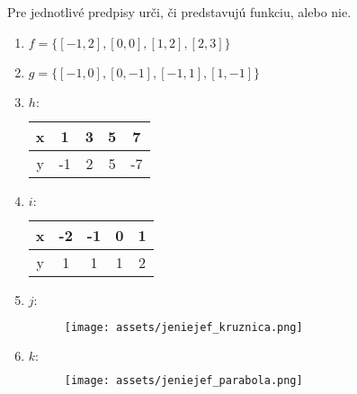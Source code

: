 \documentclass[12pt, twopage]{article}
\theoremstyle{definition}
\begin{document}
	Pre jednotlivé predpisy urči, či predstavujú funkciu, alebo nie.
	\begin{enumerate}
		\item $f = \{ [-1, 2], [0, 0], [1, 2], [2, 3]\}$
		\item $g = \{[-1, 0], [0, -1], [-1, 1], [1, -1]\}$
		\item $h:$
		\begin{tabular}{|c|c|c|c|c|}
			\hline
			x & 1 & 3 & 5 & 7 \\
			\hline
			y & -1 & 2 & 5 & -7 \\
			\hline
		\end{tabular}
		\item $i:$
		\begin{tabular}{|c|c|c|c|c|}
			\hline
			x & -2 & -1 & 0 & 1 \\
			\hline
			y & 1 & 1 & 1 & 2 \\
			\hline
		\end{tabular}
		\item $j:$
		\begin{center}
			\begin{figure}[!htbp]
				\texttt{[image: assets/jeniejef\_kruznica.png]}
			\end{figure}
		\end{center}
		
		\item $k:$\\
		\begin{center}
			\begin{figure}[!htbp]
				\texttt{[image: assets/jeniejef\_parabola.png]}
			\end{figure}
		\end{center}


		
	\end{enumerate}
\end{document}
